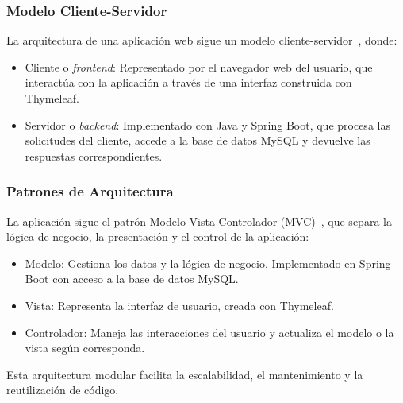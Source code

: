 \subsubsection{Modelo Cliente-Servidor}
La arquitectura de una aplicación web sigue un modelo cliente-servidor~\cite{client-server-model}, donde:
\begin{itemize}
\tightlist
\item
Cliente o \emph{frontend}: Representado por el navegador web del usuario, que interactúa con la aplicación a través de una interfaz construida con Thymeleaf.
\item
Servidor o \emph{backend}: Implementado con Java y Spring Boot, que procesa las solicitudes del cliente, accede a la base de datos MySQL y devuelve las respuestas correspondientes.
\end{itemize}

\subsubsection{Patrones de Arquitectura}
La aplicación sigue el patrón Modelo-Vista-Controlador (MVC)~\cite{modelo-vista-controrlador}, que separa la lógica de negocio, la presentación y el control de la aplicación:
\begin{itemize}
\tightlist
\item
Modelo: Gestiona los datos y la lógica de negocio. Implementado en Spring Boot con acceso a la base de datos MySQL.
\item
Vista: Representa la interfaz de usuario, creada con Thymeleaf.
\item
Controlador: Maneja las interacciones del usuario y actualiza el modelo o la vista según corresponda.
\end{itemize}
Esta arquitectura modular facilita la escalabilidad, el mantenimiento y la reutilización de código.
